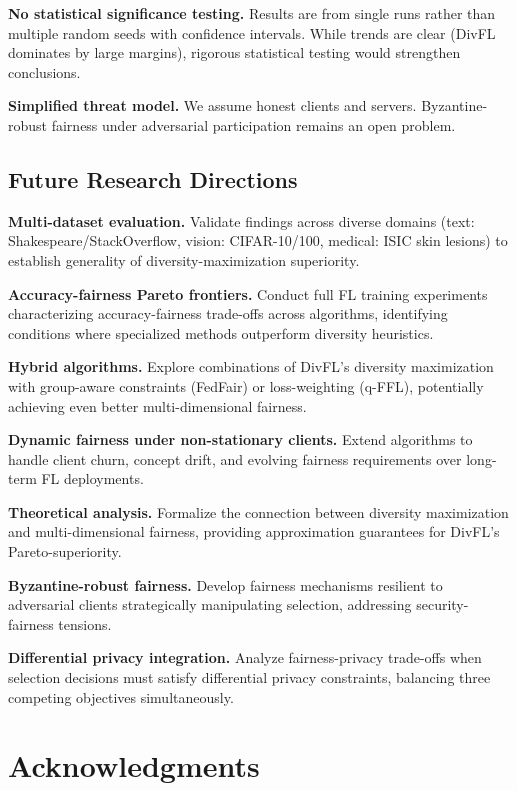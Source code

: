 \documentclass{article}
\begin{document}
\textbf{No statistical significance testing.} Results are from single runs rather than multiple random seeds with confidence intervals. While trends are clear (DivFL dominates by large margins), rigorous statistical testing would strengthen conclusions.

\textbf{Simplified threat model.} We assume honest clients and servers. Byzantine-robust fairness under adversarial participation remains an open problem.

\subsection{Future Research Directions}

\textbf{Multi-dataset evaluation.} Validate findings across diverse domains (text: Shakespeare/StackOverflow, vision: CIFAR-10/100, medical: ISIC skin lesions) to establish generality of diversity-maximization superiority.

\textbf{Accuracy-fairness Pareto frontiers.} Conduct full FL training experiments characterizing accuracy-fairness trade-offs across algorithms, identifying conditions where specialized methods outperform diversity heuristics.

\textbf{Hybrid algorithms.} Explore combinations of DivFL's diversity maximization with group-aware constraints (FedFair) or loss-weighting (q-FFL), potentially achieving even better multi-dimensional fairness.

\textbf{Dynamic fairness under non-stationary clients.} Extend algorithms to handle client churn, concept drift, and evolving fairness requirements over long-term FL deployments.

\textbf{Theoretical analysis.} Formalize the connection between diversity maximization and multi-dimensional fairness, providing approximation guarantees for DivFL's Pareto-superiority.

\textbf{Byzantine-robust fairness.} Develop fairness mechanisms resilient to adversarial clients strategically manipulating selection, addressing security-fairness tensions.

\textbf{Differential privacy integration.} Analyze fairness-privacy trade-offs when selection decisions must satisfy differential privacy constraints, balancing three competing objectives simultaneously.

\section*{Acknowledgments}
\end{document}
